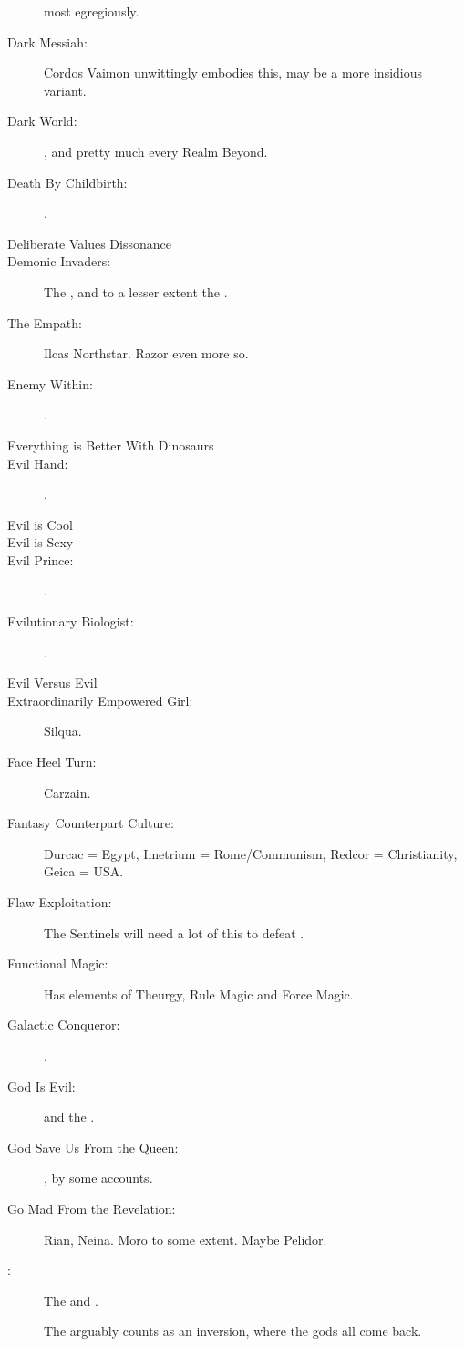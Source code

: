 \begin{flushleft}
\begin{description}
    \Ishnaruchaefir{} most egregiously.
  \item[Dark Messiah:] 
    Cordos Vaimon unwittingly embodies this, \Belzir{} may be a more insidious variant.
  \item[Dark World:] 
    \Nyx{}, and pretty much every Realm Beyond.
  \item[Death By Childbirth:] .
  \item[Deliberate Values Dissonance]
  \item[Demonic Invaders:]
    The \banes, and to a lesser extent the \xss. 
  \item[The Empath:] 
    Ilcas Northstar. Razor even more so. 
  \item[Enemy Within:] . 
  \item[Everything is Better With Dinosaurs] 
  \item[Evil Hand:] . 
  \item[Evil is Cool] 
  \item[Evil is Sexy] 
  \item[Evil Prince:] \Azraid.
  \item[Evilutionary Biologist:] \Daggerrain.
  \item[Evil Versus Evil]
  \item[Extraordinarily Empowered Girl:] Silqua. 
  \item[Face Heel Turn:] Carzain. 
  \item[Fantasy Counterpart Culture:] 
    Durcac = Egypt, Imetrium = Rome/Communism, Redcor = Christianity, Geica = USA.
  \item[Flaw Exploitation:] 
    The Sentinels will need a lot of this to defeat \Daggerrain.
  \item[Functional Magic:] 
    Has elements of Theurgy, Rule Magic and Force Magic.
  \item[Galactic Conqueror:] .
  \item[God Is Evil:] \iquin{} and the \Sephiroth.
  \item[God Save Us From the Queen:] \Belzir, by some accounts. 
  \item[Go Mad From the Revelation:] 
    Rian, Neina. 
    Moro \Cornel{} to some extent. 
    Maybe \Tiroco{} Pelidor. 
  \item[\Gotterdammerung{}:] 
    The \banewars{} and . 
    
    The \thirdbanewar arguably counts as an inversion, where the gods all come back. 
    

\end{description}
\end{flushleft}
